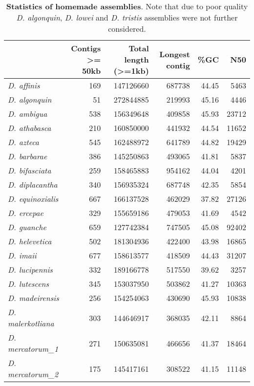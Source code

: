 \begin{table}

\caption{\textbf{Statistics of homemade assemblies}. Note that due to poor quality \textit{D. algonquin}, \textit{D. lowei} and \textit{D. tristis} assemblies were not further considered.}
\centering
\begin{tabular}[t]{l|r|r|r|r|r}
\hline
 & Contigs >= 50kb & Total length (>=1kb) & Longest contig & \%GC & N50\\
\hline
\textit{D. affinis} & 169 & 147126660 & 687738 & 44.45 & 5463\\
\hline
\textit{D. algonquin} & 51 & 272844885 & 219993 & 45.16 & 4446\\
\hline
\textit{D. ambigua} & 538 & 156349648 & 409858 & 45.93 & 23712\\
\hline
\textit{D. athabasca} & 210 & 160850000 & 441932 & 44.54 & 11652\\
\hline
\textit{D. azteca} & 545 & 162488972 & 641789 & 44.82 & 19429\\
\hline
\textit{D. barbarae} & 386 & 145250863 & 493065 & 41.81 & 5837\\
\hline
\textit{D. bifasciata} & 259 & 158465883 & 954162 & 44.04 & 4201\\
\hline
\textit{D. diplacantha} & 340 & 156935324 & 687748 & 42.35 & 5854\\
\hline
\textit{D. equinoxialis} & 667 & 166137528 & 462029 & 37.82 & 27126\\
\hline
\textit{D. ercepae} & 329 & 155659186 & 479053 & 41.69 & 4542\\
\hline
\textit{D. guanche} & 659 & 127742384 & 747505 & 45.08 & 92402\\
\hline
\textit{D. helevetica} & 502 & 181304936 & 422400 & 43.98 & 16865\\
\hline
\textit{D. imaii} & 677 & 158613577 & 418509 & 44.43 & 31207\\
\hline
\textit{D. lucipennis} & 332 & 189166778 & 517550 & 39.62 & 3257\\
\hline
\textit{D. lutescens} & 345 & 153037950 & 503862 & 41.27 & 10363\\
\hline
\textit{D. madeirensis} & 256 & 154254063 & 430690 & 45.93 & 10838\\
\hline
\textit{D. malerkotliana} & 303 & 144646917 & 368035 & 42.11 & 8864\\
\hline
\textit{D. mercatorum\_1} & 271 & 150635081 & 466656 & 41.37 & 18464\\
\hline
\textit{D. mercatorum\_2} & 175 & 145417161 & 308522 & 41.15 & 11148\\

\end{tabular}
\end{table}
